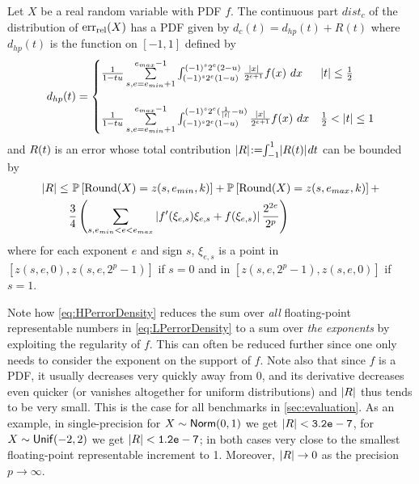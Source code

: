 \begin{theorem}\label{thm:HP_errorDensity}
Let $X$ be a real random variable with PDF $f$. The continuous part $dist_c$ of the distribution of $\mathrm{err}_{\mathrm{rel}}(X)$ has a PDF given by
$d_c(t) = d_{hp}(t) + R(t)$
where $d_{hp}(t)$ is the function on $[-1,1]$ defined by
\begin{align}
d_{hp}(t)=
\begin{cases}
 \frac{1}{1-tu}\sum\limits_{s, e=e_{min}+1}^{e_{max}-1} \int_{(-1)^s2^e(1-u)}^{(-1)^s2^e(2-u)} \frac{\left\lvert x\right\rvert}{2^{e+1}} f(x) ~dx & \left\lvert t\right\rvert\leq \frac{1}{2}\\
\\
\frac{1}{1-tu}\sum\limits_{s, e=e_{min}+1}^{e_{max}-1} \int_{(-1)^s2^e(1-u)}^{(-1)^s2^e(\frac{1}{\left\lvert t\right\rvert}-u)} \frac{\left\lvert x\right\rvert}{2^{e+1}} f(x) ~dx  &\frac{1}{2}<\left\lvert t\right\rvert\leq 1
\end{cases}\label{eq:HPerrorDensity}
\end{align}
and $R(t)\hspace{-1pt}$ is an error whose total contribution $\left\lvert R\right\rvert\hspace{-2pt}\mathrel{:=} \hspace{-3pt}\int_{-1}^{1}\hspace{-2pt}\left\lvert R(t)\right\rvert\hspace{-1pt}dt$ can be bounded by
\begin{align*}
\left\lvert R\right\rvert\leq  & ~\mathbb{P}\left[ \mathrm{Round}(X)=z(s,e_{min}, k) \right] +  \mathbb{P}\left[ \mathrm{Round}(X)=z(s,e_{max}, k) \right]  + \\
&\frac{3}{4} \left(\sum_{s, e_{min}<e<e_{max}} \left\lvert f'(\xi_{e,s})\xi_{e,s} + f(\xi_{e,s})\right\rvert\frac{2^{2e}}{2^{p}}\right)
\end{align*}
where for each exponent $e$ and sign $s$, $\xi_{e,s}$ is a point in $[z(s,e,0), z(s,e,2^{p}-1)]$ if $s=0$ and in $[z(s,e,2^{p}-1), z(s,e,0)]$ if $s=1$.
\end{theorem}

Note how \cref{eq:HPerrorDensity} reduces the sum over \emph{all} floating-point representable numbers in \cref{eq:LPerrorDensity} to a sum over \emph{the exponents} by exploiting the regularity of $f$. This can often be reduced further since one only needs to consider the exponent on the support of $f$. Note also that since $f$ is a PDF, it usually decreases very quickly away from 0, and its derivative decreases even quicker (or vanishes altogether for uniform distributions) and $\left\lvert R\right\rvert$ thus tends to be very small.  This is the case for all benchmarks in \cref{sec:evaluation}.  As an example, in single-precision for $X\sim\mathsf{Norm}(0,1)$ we get $\left\lvert R\right\rvert<\mathtt{3.2e-7}$, for $X\sim\mathsf{Unif}(-2,2)$ we get  $\left\lvert R\right\rvert<\mathtt{1.2e-7}$; in both cases very close to the smallest floating-point representable increment to 1. Moreover, $\left\lvert R\right\rvert\to 0$ as the precision $p\to\infty$.

